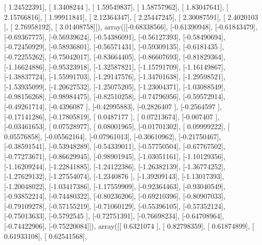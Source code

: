 \documentclass{article}
\begin{document}
       [ 1.24522391],
       [ 1.3408244 ],
       [ 1.59549837],
       [ 1.58757962],
       [ 1.83047641],
       [ 2.15766816],
       [ 1.99911841],
       [ 2.12364347],
       [ 2.25447245],
       [ 2.30087591],
       [ 2.4020103 ],
       [ 2.76958192],
       [ 3.01408758]]), array([[-0.68338566],
       [-0.61390948],
       [-0.61843479],
       [-0.69367775],
       [-0.56939624],
       [-0.54386091],
       [-0.56127393],
       [-0.58490694],
       [-0.72450929],
       [-0.58936801],
       [-0.56571431],
       [-0.59309135],
       [-0.6181435 ],
       [-0.72255262],
       [-0.75042017],
       [-0.83664405],
       [-0.86607693],
       [-0.81829364],
       [-1.16624886],
       [-0.95323918],
       [-1.32587821],
       [-1.15791709],
       [-1.16149867],
       [-1.38837724],
       [-1.55991703],
       [-1.29147576],
       [-1.34701638],
       [-1.29598521],
       [-1.53935099],
       [-1.20627532],
       [-1.25075205],
       [-1.23004371],
       [-1.03088549],
       [-0.98156268],
       [-0.98984475],
       [-0.82510258],
       [-0.74796956],
       [-0.59572914],
       [-0.49261714],
       [-0.4396087 ],
       [-0.42995883],
       [-0.2826407 ],
       [-0.2564597 ],
       [-0.17141286],
       [-0.17805819],
       [ 0.0487177 ],
       [ 0.07213674],
       [-0.007407  ],
       [-0.03461653],
       [ 0.07528977],
       [ 0.08001965],
       [-0.01701302],
       [ 0.09999222],
       [ 0.05576858],
       [-0.05562164],
       [-0.07961013],
       [-0.30610962],
       [-0.21750467],
       [-0.38591541],
       [-0.53948289],
       [-0.54339011],
       [-0.57750504],
       [-0.67767502],
       [-0.77273671],
       [-0.86629945],
       [-0.98901945],
       [-1.03051161],
       [-1.10129356],
       [-1.16209244],
       [-1.22841885],
       [-1.24122386],
       [-1.26382139],
       [-1.36774252],
       [-1.27629132],
       [-1.27554074],
       [-1.2340876 ],
       [-1.39209143],
       [-1.13017393],
       [-1.20048022],
       [-1.03417386],
       [-1.17559909],
       [-0.92364463],
       [-0.93040549],
       [-0.93852214],
       [-0.74480322],
       [-0.80236206],
       [-0.69210396],
       [-0.80907033],
       [-0.79109278],
       [-0.57155219],
       [-0.71060129],
       [-0.55396105],
       [-0.57352124],
       [-0.75013633],
       [-0.5792545 ],
       [-0.72751391],
       [-0.76698234],
       [-0.64708964],
       [-0.74422906],
       [-0.75220084]]), array([[ 0.6321074 ],
       [ 0.82798359],
       [ 0.61874899],
       [ 0.61933108],
       [ 0.62541568],
\end{document}
